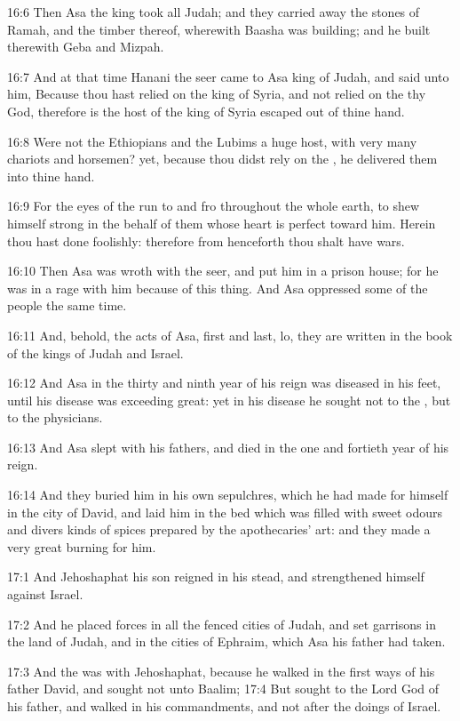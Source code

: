 16:6 Then Asa the king took all Judah; and they carried away the
stones of Ramah, and the timber thereof, wherewith Baasha was
building; and he built therewith Geba and Mizpah.

16:7 And at that time Hanani the seer came to Asa king of Judah, and
said unto him, Because thou hast relied on the king of Syria, and not
relied on the \LORD thy God, therefore is the host of the king of Syria
escaped out of thine hand.

16:8 Were not the Ethiopians and the Lubims a huge host, with very
many chariots and horsemen? yet, because thou didst rely on the \LORD,
he delivered them into thine hand.

16:9 For the eyes of the \LORD run to and fro throughout the whole
earth, to shew himself strong in the behalf of them whose heart is
perfect toward him. Herein thou hast done foolishly: therefore from
henceforth thou shalt have wars.

16:10 Then Asa was wroth with the seer, and put him in a prison house;
for he was in a rage with him because of this thing. And Asa oppressed
some of the people the same time.

16:11 And, behold, the acts of Asa, first and last, lo, they are
written in the book of the kings of Judah and Israel.

16:12 And Asa in the thirty and ninth year of his reign was diseased
in his feet, until his disease was exceeding great: yet in his disease
he sought not to the \LORD, but to the physicians.

16:13 And Asa slept with his fathers, and died in the one and fortieth
year of his reign.

16:14 And they buried him in his own sepulchres, which he had made for
himself in the city of David, and laid him in the bed which was filled
with sweet odours and divers kinds of spices prepared by the
apothecaries' art: and they made a very great burning for him.

17:1 And Jehoshaphat his son reigned in his stead, and strengthened
himself against Israel.

17:2 And he placed forces in all the fenced cities of Judah, and set
garrisons in the land of Judah, and in the cities of Ephraim, which
Asa his father had taken.

17:3 And the \LORD was with Jehoshaphat, because he walked in the first
ways of his father David, and sought not unto Baalim; 17:4 But sought
to the Lord God of his father, and walked in his commandments, and not
after the doings of Israel.


